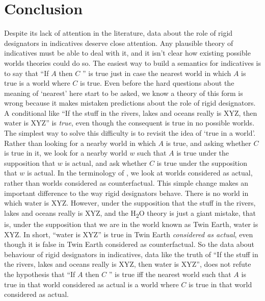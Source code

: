 
\section{Conclusion}
Despite its lack of attention in the literature, data about the role of rigid designators in indicatives deserve close attention. Any plausible theory of indicatives must be able to deal with it, and it isn't clear how existing possible worlds theories could do so. The easiest way to build a semantics for indicatives is to say that ``If \(A\) then \(C\) '' is true just in case the nearest world in which \(A\) is true is a world where \(C\) is true. Even before the hard questions about the meaning of `nearest' here start to be asked, we know a theory of this form is wrong because it makes mistaken predictions about the role of rigid designators. A conditional like ``If the stuff in the rivers, lakes and oceans really is XYZ, then water is XYZ'' is \textit{true}, even though the consequent is true in no possible worlds. The simplest way to solve this difficulty is to revisit the idea of `true in a world'. Rather than looking for a nearby world in which \(A\) is true, and asking whether \(C\) is true in it, we look for a nearby world \(w\) such that \(A\) is true under the supposition that \(w\) is actual, and ask whether \(C\) is true under the supposition that \(w\) is actual. In the terminology of \citet{Jackson1998}, we look at worlds considered as actual, rather than worlds considered as counterfactual. This simple change makes an important difference to the way rigid designators behave. There is no world in which water is XYZ. However, under the supposition that the stuff in the rivers, lakes and oceans really is XYZ, and the H\textsubscript{2}O theory is just a giant mistake, that is, under the supposition that we are in the world known as Twin Earth, water is XYZ. In short, ``water is XYZ'' is true in Twin Earth \textit{considered as actual}, even though it is false in Twin Earth considered as counterfactual. So the data about behaviour of rigid designators in indicatives, data like the truth of ``If the stuff in the rivers, lakes and oceans really is XYZ, then water is XYZ'', does not refute the hypothesis that ``If \(A\) then \(C\) '' is true iff the nearest world such that \(A\) is true in that world considered as actual is a world where \(C\) is true in that world considered as actual.

